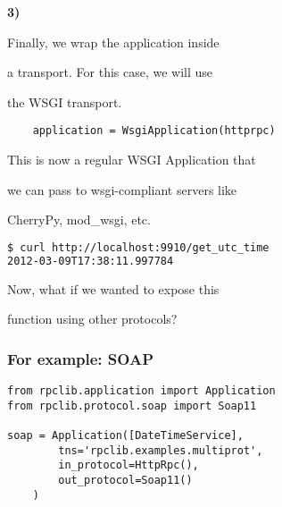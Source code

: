 \documentclass{beamer}
\begin{document}
\begin{frame}
  \LARGE
  \color{red} \textbf{3)} \color{black}

  \begin{center}
    Finally, we wrap the application inside

    \bigskip

    a transport. For this case, we will use

    \bigskip

    the WSGI transport.

  \end{center}

\end{frame}

\begin{frame}[fragile]
 \begin{lstlisting}
    application = WsgiApplication(httprpc)
 \end{lstlisting}

  \begin{center} 
    This is now a regular WSGI Application that 

    \bigskip

    we can pass to wsgi-compliant servers like 

    \bigskip

    CherryPy, mod\_wsgi, etc.
  \end{center}
  \begin{lstlisting}[language=sh]
$ curl http://localhost:9910/get_utc_time 
2012-03-09T17:38:11.997784
  \end{lstlisting}
\end{frame}

\begin{frame}
  \LARGE
  \begin{center}
    Now, what if we wanted to expose this

    \bigskip

    function using other protocols?
  \end{center}
\end{frame}

\begin{frame}[fragile]    
  \frametitle{For example: SOAP}

  \begin{lstlisting}
from rpclib.application import Application
from rpclib.protocol.soap import Soap11

soap = Application([DateTimeService],
        tns='rpclib.examples.multiprot',
        in_protocol=HttpRpc(),
        out_protocol=Soap11()
    )
  \end{lstlisting}
\end{frame}
\end{document}
